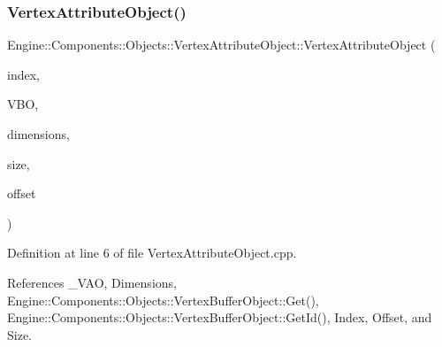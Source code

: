 \subsubsection{\texorpdfstring{Vertex\+Attribute\+Object()}{VertexAttributeObject()}}
{\footnotesize\ttfamily Engine\+::\+Components\+::\+Objects\+::\+Vertex\+Attribute\+Object\+::\+Vertex\+Attribute\+Object (\begin{DoxyParamCaption}\item[{int}]{index,  }\item[{\mbox{\hyperlink{classEngine_1_1Components_1_1Objects_1_1VertexBufferObject}{Vertex\+Buffer\+Object}} $\ast$}]{V\+BO,  }\item[{int}]{dimensions,  }\item[{int}]{size,  }\item[{int}]{offset }\end{DoxyParamCaption})}



Definition at line 6 of file Vertex\+Attribute\+Object.\+cpp.



References \+\_\+\+V\+AO, Dimensions, Engine\+::\+Components\+::\+Objects\+::\+Vertex\+Buffer\+Object\+::\+Get(), Engine\+::\+Components\+::\+Objects\+::\+Vertex\+Buffer\+Object\+::\+Get\+Id(), Index, Offset, and Size.


